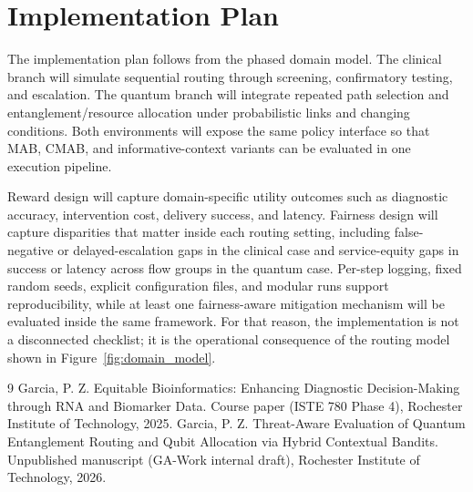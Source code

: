 \documentclass{IEEEtran}
\begin{document}
\section{Implementation Plan}
The implementation plan follows from the phased domain model. The clinical branch will simulate sequential routing through screening, confirmatory testing, and escalation. The quantum branch will integrate repeated path selection and entanglement/resource allocation under probabilistic links and changing conditions. Both environments will expose the same policy interface so that MAB, CMAB, and informative-context variants can be evaluated in one execution pipeline.

Reward design will capture domain-specific utility outcomes such as diagnostic accuracy, intervention cost, delivery success, and latency. Fairness design will capture disparities that matter inside each routing setting, including false-negative or delayed-escalation gaps in the clinical case and service-equity gaps in success or latency across flow groups in the quantum case. Per-step logging, fixed random seeds, explicit configuration files, and modular runs support reproducibility, while at least one fairness-aware mitigation mechanism will be evaluated inside the same framework. For that reason, the implementation is not a disconnected checklist; it is the operational consequence of the routing model shown in Figure~\ref{fig:domain_model}.

\begin{thebibliography}{9}\setlength{\itemsep}{0em}
Garcia, P. Z. Equitable Bioinformatics: Enhancing Diagnostic Decision-Making through {RNA}
and Biomarker Data. Course paper (ISTE 780 Phase 4), Rochester Institute of Technology,
2025.
Garcia, P. Z. Threat-Aware Evaluation of Quantum Entanglement Routing and Qubit Allocation
via Hybrid Contextual Bandits. Unpublished manuscript (GA-Work internal draft), Rochester
Institute of Technology, 2026.
\end{thebibliography}
\end{document}
